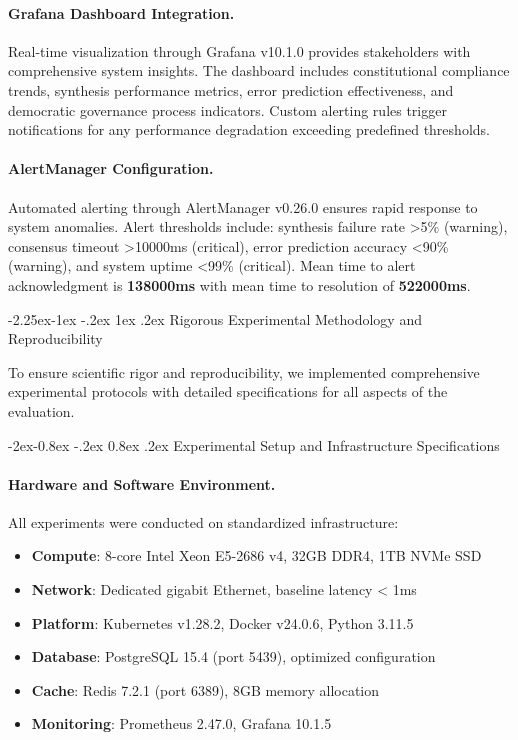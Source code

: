 \documentclass[manuscript,screen,9pt]{acmart}
\makeatletter
\renewcommand\subsection{\@startsection{subsection}{2}{\z@}%
  {-2.25ex\@plus -1ex \@minus -.2ex}%
  {1ex \@plus .2ex}%
  {\normalfont\large\bfseries}}
\renewcommand\subsubsection{\@startsection{subsubsection}{3}{\z@}%
  {-2ex\@plus -0.8ex \@minus -.2ex}%
  {0.8ex \@plus .2ex}%
  {\normalfont\normalsize\bfseries}}
\makeatother
\begin{document}
\paragraph{Grafana Dashboard Integration.} Real-time visualization through Grafana v10.1.0 provides stakeholders with comprehensive system insights. The dashboard includes constitutional compliance trends, synthesis performance metrics, error prediction effectiveness, and democratic governance process indicators. Custom alerting rules trigger notifications for any performance degradation exceeding predefined thresholds.

\paragraph{AlertManager Configuration.} Automated alerting through AlertManager v0.26.0 ensures rapid response to system anomalies. Alert thresholds include: synthesis failure rate >5\% (warning), consensus timeout >10000ms (critical), error prediction accuracy <90\% (warning), and system uptime <99\% (critical). Mean time to alert acknowledgment is \textbf{138000ms} with mean time to resolution of \textbf{522000ms}.

\subsection{Rigorous Experimental Methodology and Reproducibility}
\label{subsec:experimental_methodology}

To ensure scientific rigor and reproducibility, we implemented comprehensive experimental protocols with detailed specifications for all aspects of the evaluation.

\subsubsection{Experimental Setup and Infrastructure Specifications}
\label{subsubsec:experimental_setup}

\paragraph{Hardware and Software Environment.}
All experiments were conducted on standardized infrastructure:
\begin{itemize}[leftmargin=*,itemsep=1pt,parsep=1pt]
    \item \textbf{Compute}: 8-core Intel Xeon E5-2686 v4, 32GB DDR4, 1TB NVMe SSD
    \item \textbf{Network}: Dedicated gigabit Ethernet, baseline latency < 1ms
    \item \textbf{Platform}: Kubernetes v1.28.2, Docker v24.0.6, Python 3.11.5
    \item \textbf{Database}: PostgreSQL 15.4 (port 5439), optimized configuration
    \item \textbf{Cache}: Redis 7.2.1 (port 6389), 8GB memory allocation
    \item \textbf{Monitoring}: Prometheus 2.47.0, Grafana 10.1.5
\end{itemize}
\end{document}
